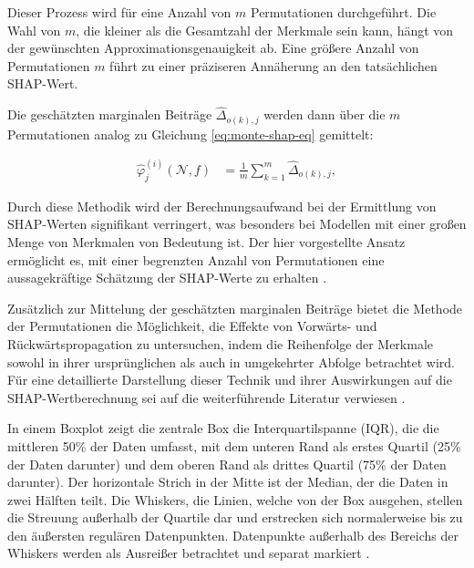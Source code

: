 Dieser Prozess wird für eine Anzahl von $m$ Permutationen durchgeführt. Die Wahl von $m$,
die kleiner als die Gesamtzahl der Merkmale sein kann, hängt von der gewünschten Approximationsgenauigkeit
ab. Eine größere Anzahl von Permutationen $m$ führt zu einer präziseren Annäherung an den tatsächlichen SHAP-Wert.

Die geschätzten marginalen Beiträge $\hat{\Delta}_{o(k), j}$ werden dann über die $m$ Permutationen analog zu Gleichung
\ref{eq:monte-shap-eq} gemittelt:

\begin{align}
    \label{eq:permu-shap-eq}
    \hat{\varphi}^{(i)}_{j} (\mathcal{N}, f) &= \frac{1}{m}\sum_{k=1}^{m}\hat{\Delta}_{o(k), j},
\end{align}

Durch diese Methodik wird der Berechnungsaufwand bei der Ermittlung von SHAP-Werten 
signifikant verringert, was besonders bei Modellen mit einer großen Menge von Merkmalen von 
Bedeutung ist. Der hier vorgestellte Ansatz ermöglicht es, mit einer begrenzten Anzahl von 
Permutationen eine aussagekräftige Schätzung der SHAP-Werte zu erhalten \cite[S. 39]{Molnar_2023}.

Zusätzlich zur Mittelung der geschätzten marginalen Beiträge bietet die Methode der Permutationen 
die Möglichkeit, die Effekte von Vorwärts- und Rückwärtspropagation zu untersuchen, 
indem die Reihenfolge der Merkmale sowohl in ihrer ursprünglichen als auch in umgekehrter 
Abfolge betrachtet wird. Für eine detaillierte Darstellung dieser Technik und ihrer 
Auswirkungen auf die SHAP-Wertberechnung sei auf die weiterführende Literatur verwiesen \cite[S. 39f]{Molnar_2023}.
                                         



In einem Boxplot zeigt die zentrale Box die Interquartilspanne (IQR), 
die die mittleren 50\% der Daten umfasst, mit dem unteren Rand als erstes Quartil 
(25\% der Daten darunter) und dem oberen Rand als drittes Quartil (75\% der Daten darunter). 
Der horizontale Strich in der Mitte ist der Median, der die Daten in zwei Hälften teilt. 
Die Whiskers, die Linien, welche von der Box ausgehen, stellen die Streuung außerhalb der Quartile dar und 
erstrecken sich normalerweise bis zu den äußersten regulären Datenpunkten. 
Datenpunkte außerhalb des Bereichs der Whiskers werden als Ausreißer betrachtet und separat markiert \cite[S. 43]{Molnar_2022}. 